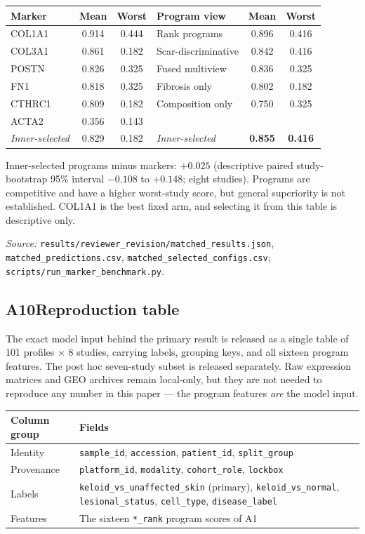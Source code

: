 {\small
\begin{tabular}{@{}lcc|lcc@{}}
\toprule
Marker & Mean & Worst & Program view & Mean & Worst \\
\midrule
COL1A1 & 0.914 & 0.444 & Rank programs & 0.896 & 0.416 \\
COL3A1 & 0.861 & 0.182 & Scar-discriminative & 0.842 & 0.416 \\
POSTN  & 0.826 & 0.325 & Fused multiview & 0.836 & 0.325 \\
FN1    & 0.818 & 0.325 & Fibrosis only & 0.802 & 0.182 \\
CTHRC1 & 0.809 & 0.182 & Composition only & 0.750 & 0.325 \\
ACTA2  & 0.356 & 0.143 & & & \\
\midrule
\textit{Inner-selected} & 0.829 & 0.182 & \textit{Inner-selected} & \textbf{0.855} & \textbf{0.416} \\
\bottomrule
\end{tabular}
}

\smallskip
Inner-selected programs minus markers: $+0.025$ (descriptive paired
study-bootstrap 95\% interval $-0.108$ to $+0.148$; eight studies). Programs are
competitive and have a higher worst-study score, but general superiority is not
established. COL1A1 is the best fixed arm, and selecting it from this table is
descriptive only.

\noindent\textit{Source:} \texttt{results/reviewer\_revision/matched\_results.json},
\texttt{matched\_predictions.csv}, \texttt{matched\_selected\_configs.csv};
\texttt{scripts/run\_marker\_benchmark.py}.

\subsection*{A10\quad Reproduction table}
\label{app:repro}

The exact model input behind the primary result is released as a single
table of 101 profiles $\times$ 8 studies, carrying labels, grouping keys, and
all sixteen program features. The post hoc seven-study subset is released
separately. Raw expression matrices and GEO archives remain
local-only, but they are not needed to reproduce any number in this paper ---
the program features \emph{are} the model input.

{\small
\begin{tabular}{@{}lp{8.8cm}@{}}
\toprule
Column group & Fields \\
\midrule
Identity & \texttt{sample\_id}, \texttt{accession}, \texttt{patient\_id}, \texttt{split\_group} \\
Provenance & \texttt{platform\_id}, \texttt{modality}, \texttt{cohort\_role}, \texttt{lockbox} \\
Labels & \texttt{keloid\_vs\_unaffected\_skin} (primary), \texttt{keloid\_vs\_normal}, \texttt{lesional\_status}, \texttt{cell\_type}, \texttt{disease\_label} \\
Features & The sixteen \texttt{*\_rank} program scores of A1 \\
\bottomrule
\end{tabular}
}

